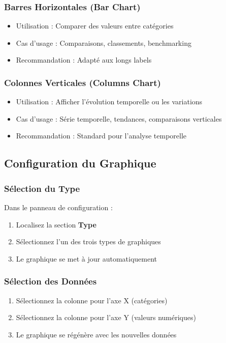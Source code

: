 \documentclass[11pt, a4paper]{article}
\begin{document}
\subsubsection{Barres Horizontales (Bar Chart)}
\begin{itemize}
    \item Utilisation : Comparer des valeurs entre catégories
    \item Cas d'usage : Comparaisons, classements, benchmarking
    \item Recommandation : Adapté aux longs labels
\end{itemize}

\subsubsection{Colonnes Verticales (Columns Chart)}
\begin{itemize}
    \item Utilisation : Afficher l'évolution temporelle ou les variations
    \item Cas d'usage : Série temporelle, tendances, comparaisons verticales
    \item Recommandation : Standard pour l'analyse temporelle
\end{itemize}

\subsection{Configuration du Graphique}

\subsubsection{Sélection du Type}
Dans le panneau de configuration :

\begin{enumerate}
    \item Localisez la section \textbf{Type}
    \item Sélectionnez l'un des trois types de graphiques
    \item Le graphique se met à jour automatiquement
\end{enumerate}

\subsubsection{Sélection des Données}
\begin{enumerate}
    \item Sélectionnez la colonne pour l'axe X (catégories)
    \item Sélectionnez la colonne pour l'axe Y (valeurs numériques)
    \item Le graphique se régénère avec les nouvelles données
\end{enumerate}
\end{document}
